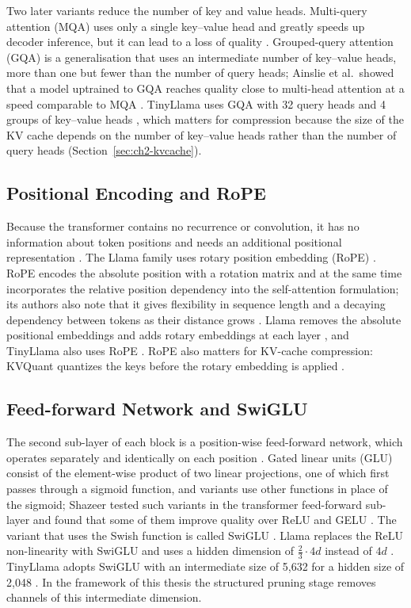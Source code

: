 \documentclass[
11pt, %
english, %
singlespacing, %
headsepline, %
]{MastersDoctoralThesis} %
\begin{document}
Two later variants reduce the number of key and value heads. Multi-query attention (MQA) uses only a single key--value head and greatly speeds up decoder inference, but it can lead to a loss of quality \cite{ainslie2023gqa}. Grouped-query attention (GQA) is a generalisation that uses an intermediate number of key--value heads, more than one but fewer than the number of query heads; Ainslie et al.\ showed that a model uptrained to GQA reaches quality close to multi-head attention at a speed comparable to MQA \cite{ainslie2023gqa}. TinyLlama uses GQA with 32 query heads and 4 groups of key--value heads \cite{zhang2024tinyllama}, which matters for compression because the size of the KV cache depends on the number of key--value heads rather than the number of query heads (Section~\ref{sec:ch2-kvcache}).

\subsection{Positional Encoding and RoPE}
\label{sec:ch2-rope}

Because the transformer contains no recurrence or convolution, it has no information about token positions and needs an additional positional representation \cite{lin2021survey}. The Llama family uses rotary position embedding (RoPE) \cite{touvron2023llama}. RoPE encodes the absolute position with a rotation matrix and at the same time incorporates the relative position dependency into the self-attention formulation; its authors also note that it gives flexibility in sequence length and a decaying dependency between tokens as their distance grows \cite{su2023roformer}. Llama removes the absolute positional embeddings and adds rotary embeddings at each layer \cite{touvron2023llama}, and TinyLlama also uses RoPE \cite{zhang2024tinyllama}. RoPE also matters for KV-cache compression: KVQuant quantizes the keys before the rotary embedding is applied \cite{hooper2024kvquant}.

\subsection{Feed-forward Network and SwiGLU}
\label{sec:ch2-ffn}

The second sub-layer of each block is a position-wise feed-forward network, which operates separately and identically on each position \cite{lin2021survey}. Gated linear units (GLU) consist of the element-wise product of two linear projections, one of which first passes through a sigmoid function, and variants use other functions in place of the sigmoid; Shazeer tested such variants in the transformer feed-forward sub-layer and found that some of them improve quality over ReLU and GELU \cite{shazeer2020glu}. The variant that uses the Swish function is called SwiGLU \cite{shazeer2020glu}. Llama replaces the ReLU non-linearity with SwiGLU and uses a hidden dimension of $\frac{2}{3} \cdot 4d$ instead of $4d$ \cite{touvron2023llama}. TinyLlama adopts SwiGLU with an intermediate size of 5{,}632 for a hidden size of 2{,}048 \cite{zhang2024tinyllama}. In the framework of this thesis the structured pruning stage removes channels of this intermediate dimension.
\end{document}
